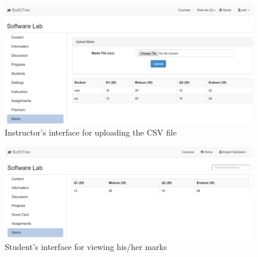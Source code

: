 \begin{figure}[h]
\centering
\includegraphics[width=0.95\linewidth]{./media/CDmarks}
\caption{Instructor's interface for uploading the CSV file}
\label{fig:CDmarks}
\end{figure}
\begin{figure}[h]
\centering
\includegraphics[width=0.95\linewidth]{./media/Smarks}
\caption{Student's interface for viewing his/her marks}
\label{fig:Smarks}
\end{figure}


